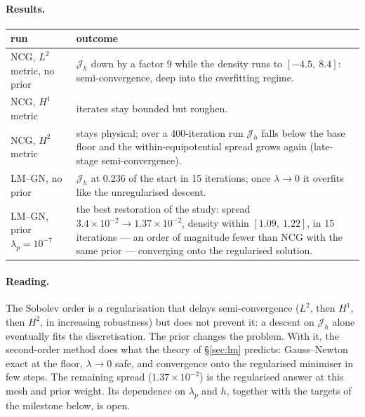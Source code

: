 \documentclass[11pt]{article}
\newcommand{\Jf}{\mathscr{J}}  %
\begin{document}
\paragraph{Results.}
\begin{center}
\begin{tabular}{p{} p{}}
  run & outcome \\ \hline
  NCG, $L^2$ metric, no prior &
    $\Jf _h$ down by a factor $9$ while the density runs to
    $[-4.5,\ 8.4]$: semi-convergence, deep into the overfitting regime. \\
  NCG, $H^1$ metric &
    iterates stay bounded but roughen. \\
  NCG, $H^2$ metric &
    stays physical; over a 400-iteration run $\Jf _h$ falls below the base
    floor and the within-equipotential spread grows again
    (late-stage semi-convergence). \\
  LM--GN, no prior &
    $\Jf _h$ at $0.236$ of the start in 15 iterations; once $\lambda\to0$ it
    overfits like the unregularised descent. \\
  LM--GN, prior $\lambda_p = 10^{-7}$ &
    the best restoration of the study: spread $3.4\times10^{-2}\to
    1.37\times10^{-2}$, density within $[1.09,\ 1.22]$, in 15 iterations ---
    an order of magnitude fewer than NCG with the same prior --- converging
    onto the regularised solution.
\end{tabular}
\end{center}

\paragraph{Reading.} The Sobolev order is a regularisation that delays
semi-convergence ($L^2$, then $H^1$, then $H^2$, in increasing
robustness) but does not prevent it: a descent on $\Jf _h$ alone eventually
fits the discretisation. The prior changes the problem. With it, the
second-order method does what the theory of \S\ref{sec:lm} predicts:
Gauss--Newton exact at the floor, $\lambda\to0$ safe, and convergence onto
the regularised minimiser in few steps. The remaining spread
($1.37\times10^{-2}$) is the regularised answer at this mesh and prior
weight. Its dependence on $\lambda_p$ and $h$, together with the
targets of the milestone below, is open.
\end{document}
